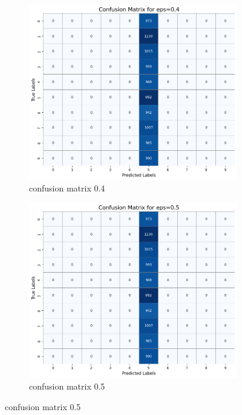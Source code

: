 \documentclass[11pt,onside]{article}
\begin{document}
\begin{figure}[h]
  \centering
  \begin{subfigure}[b]{0.49\textwidth}
    \centering
    \includegraphics[width=\textwidth]{V2_images/confusion_matrix_eps_0.4.png}
    \caption{confusion matrix 0.4}
    \label{fig:image1}
  \end{subfigure}
  \hfill
  \begin{subfigure}[b]{0.49\textwidth}
    \centering
    \includegraphics[width=\textwidth]{V2_images/confusion_matrix_eps_0.5.png}
    \caption{confusion matrix 0.5}
    \label{fig:image2}
  \end{subfigure}

  \label{fig:images}
\end{figure}
\end{document}
